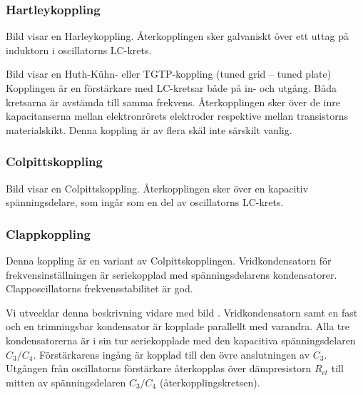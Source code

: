 \subsubsection{Hartleykoppling}


Bild  visar en Harleykoppling.
%
Återkopplingen sker galvaniskt över ett uttag på induktorn i oscillatorns
LC-krets.

Bild  visar en Huth-Kühn- eller TGTP-kopp\-ling
(tuned grid -- tuned plate)
%
Kopplingen är en förstärkare med LC-kretsar både på in- och utgång.
Båda kretsarna är avstämda till samma frekvens.
Återkopplingen sker över de inre kapacitanserna mellan elektronrörets elektroder
respektive mellan transistorns materialskikt.
Denna koppling är av flera skäl inte särskilt vanlig.

\subsubsection{Colpittskoppling}

Bild  visar en Colpittskoppling.
%
Återkopplingen sker över en kapacitiv spänningsdelare, som ingår som
en del av oscillatorns LC-krets.

\subsubsection{Clappkoppling}

Denna koppling är en variant av Colpittskopplingen.
Vridkondensatorn för frekvensinställningen är seriekopplad med spänningsdelarens
kondensatorer.
Clapposcillatorns frekvensstabilitet är god.

Vi utvecklar denna beskrivning vidare med bild .
Vridkondensatorn samt en fast och en trimningsbar kondensator är kopplade
parallellt med varandra.
Alla tre kondensatorerna är i sin tur seriekopplade med den kapacitiva
spänningsdelaren \(C_3/C_4\).
Förstärkarens ingång är kopplad till den övre anslutningen av \(C_3\).
Utgången från oscillatorns förstärkare återkopplas över dämpresistorn
\(R_{ct}\) till mitten av spänningsdelaren \(C_3/C_4\)
(återkopplingskretsen).

